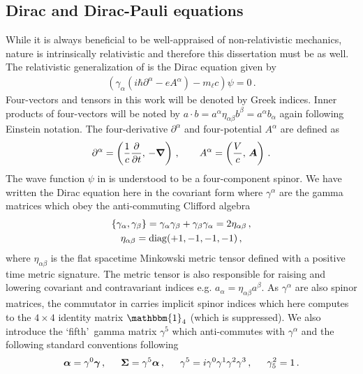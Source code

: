 \subsection{Dirac and Dirac-Pauli equations}
\label{sec:dp}
\noindent While it is always beneficial to be well-appraised of non-relativistic mechanics, nature is intrinsically relativistic and therefore this dissertation must be as well. The relativistic generalization of  is the Dirac equation given by
\begin{gather}
    \label{dirac:1}
    \left(\gamma_{\alpha}\left(i\hbar\partial^{\alpha} - eA^{\alpha}\right)-m_{\ell}c\right)\psi=0\,.
\end{gather}
Four-vectors and tensors in this work will be denoted by Greek indices. Inner products of four-vectors will be noted by $a\cdot b=a^{\alpha}\eta_{\alpha\beta}b^{\beta}=a^{\alpha}b_{\alpha}$ again following Einstein notation. The four-derivative $\partial^{\alpha}$ and four-potential $A^{\alpha}$ are defined as
\begin{gather}
    \label{dirac:2}
    \partial^{\alpha}=\left(\frac{1}{c}\frac{\partial}{\partial t},\,-\boldsymbol{\nabla}\right)\,,\qquad A^{\alpha}=\left(\frac{V}{c},\,\boldsymbol{A}\right)\,.
\end{gather}
The wave function $\psi$ in  is understood to be a four-component spinor. We have written the Dirac equation here in the covariant form where $\gamma^{\alpha}$ are the gamma matrices which obey the anti-commuting Clifford algebra
\begin{gather}
    \label{gamma:1}
    \{\gamma_{\alpha},\gamma_{\beta}\}=\gamma_{\alpha}\gamma_{\beta} + \gamma_{\beta}\gamma_{\alpha} = 2\eta_{\alpha\beta}\,,\\
    \eta_{\alpha\beta}={\rm diag}(+1,-1,-1,-1)\,,
\end{gather}
where $\eta_{\alpha\beta}$ is the flat spacetime Minkowski metric tensor defined with a positive time metric signature. The metric tensor is also responsible for raising and lowering covariant and contravariant indices e.g. $a_{\alpha}=\eta_{\alpha\beta}a^{\beta}$. As $\gamma^{\alpha}$ are also spinor matrices, the commutator in  carries implicit spinor indices which here computes to the $4\times4$ identity matrix $\mathbbm{1}_{4}$ (which is suppressed). We also introduce the \lq fifth\rq\ gamma matrix $\gamma^{5}$ which anti-commutes with $\gamma^{\alpha}$ and the following standard conventions following~\cite{Itzykson:1980rh}
\begin{alignat}{1}
	\label{conventions:1} \bb{\alpha}=\gamma^{0}\bb{\gamma}\,,\indent \bb{\Sigma}=\gamma^{5}\bb{\alpha}\,,\indent \gamma^{5}=i\gamma^{0}\gamma^{1}\gamma^{2}\gamma^{3}\,,\indent \gamma^{2}_{5}=1\,.
\end{alignat}

